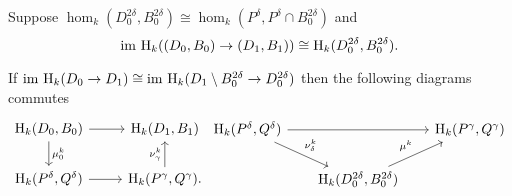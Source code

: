 
\begin{theorem}
    Suppose $\hom_k(D_0^{2\delta}, B_0^{2\delta})\cong \hom_k(P^\delta, P^\delta\cap B_0^{2\delta})$ and \[\mathrm{im}~\mathrm{H}_k((D_0,B_0)\to (D_1,B_1))\cong\mathrm{H}_k(D_0^{2\delta},B_0^{2\delta}).\]

    If $\mathrm{im}~\mathrm{H}_k(D_0\to D_1)\cong\mathrm{im}~\mathrm{H}_k(D_1\setminus B_0^{2\delta}\to D_0^{2\delta})$ then the following diagrams commutes
    \[\begin{tikzcd}
        \hom_k(D_0, B_0)\arrow{r}\arrow{d}{\mu^k_0} &
        \hom_k(D_1, B_1)\\
        \hom_k(P^\delta, Q^\delta)\arrow{r} &
        \hom_k(P^\gamma, Q^\gamma).\arrow{u}{\nu^k_\gamma}
    \end{tikzcd}
    \begin{tikzcd}[column sep=scriptsize]
        \hom_k(P^\delta, Q^\delta)\arrow{dr}{\nu^k_\delta}\arrow{rr} & &
        \hom_k(P^\gamma, Q^\gamma)\\
        & \hom_k(D_0^{2\delta},B_0^{2\delta})\arrow{ur}{\mu^k}
    \end{tikzcd}\]
\end{theorem}
